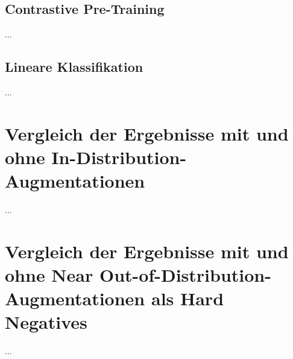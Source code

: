 \subsection{Contrastive Pre-Training}

...

\subsection{Lineare Klassifikation}

...

\section{Vergleich der Ergebnisse mit und ohne In-Distribution-Augmentationen}

...

\section{Vergleich der Ergebnisse mit und ohne Near Out-of-Distribution-Augmentationen als Hard Negatives}

...
